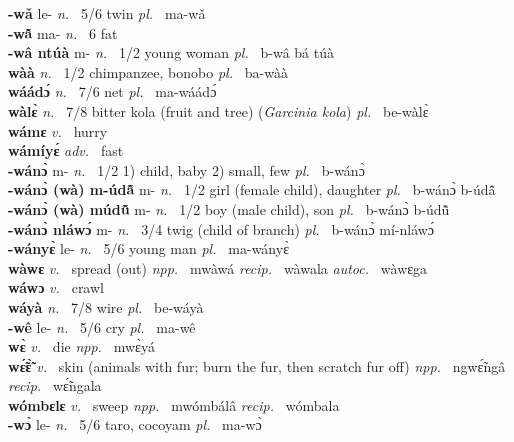 \noindent
{\bfseries -wǎ} le- {\itshape n.~} 5/6 twin {\itshape pl.~} ma-wǎ    \\ 
{\bfseries -wã̂} ma- {\itshape n.~} 6 fat    \\ 
{\bfseries -wâ ntúà} m- {\itshape n.~} 1/2 young woman {\itshape pl.~} b-wâ bá túà    \\ 
{\bfseries wàà} {\itshape n.~} 1/2 chimpanzee, bonobo {\itshape pl.~} ba-wàà    \\ 
{\bfseries wáádɔ́}  {\itshape n.~} 7/6 net {\itshape pl.~} ma-wáádɔ́    \\ 
{\bfseries wàlɛ̀}  {\itshape n.~} 7/8 bitter kola (fruit and tree) ({\itshape Garcinia kola}) {\itshape pl.~} be-wàlɛ̀    \\ 
{\bfseries wámɛ}  {\itshape v.~} hurry    \\ 
{\bfseries wámíyɛ́}  {\itshape adv.~} fast    \\ 
{\bfseries -wánɔ̀} m- {\itshape n.~} 1/2 1) child, baby 2) small, few {\itshape pl.~} b-wánɔ̀    \\ 
{\bfseries -wánɔ̀ (wà) m-údã̂} m- {\itshape n.~} 1/2 girl (female child), daughter {\itshape pl.~} b-wánɔ̀ b-údã̂    \\ 
{\bfseries -wánɔ̀ (wà) múdũ̂} m- {\itshape n.~} 1/2 boy (male child), son {\itshape pl.~} b-wánɔ̀ b-údũ̂    \\ 
{\bfseries -wánɔ̀ nláwɔ́} m- {\itshape n.~} 3/4 twig (child of branch) {\itshape pl.~} b-wánɔ̀ mí-nláwɔ́    \\ 
{\bfseries -wányɛ̀} le- {\itshape n.~} 5/6 young man {\itshape pl.~} ma-wányɛ̀    \\ 
{\bfseries wàwɛ}  {\itshape v.~} spread (out)   {\itshape npp.~} mwàwá {\itshape recip.~} wàwala {\itshape autoc.~} wàwɛga  \\ 
{\bfseries wáwɔ}  {\itshape v.~} crawl    \\ 
{\bfseries wáyà}  {\itshape n.~} 7/8 wire {\itshape pl.~} be-wáyà    \\ 
{\bfseries -wê} le- {\itshape n.~} 5/6 cry {\itshape pl.~} ma-wê    \\ 
{\bfseries wɛ̀}  {\itshape v.~} die   {\itshape npp.~} mwɛ̀yá  \\ 
{\bfseries wɛ̃́ɛ̃̀}  {\itshape v.~} skin (animals with fur; burn the fur, then scratch fur off)   {\itshape npp.~} ngwɛ̃́ngâ {\itshape recip.~} wɛ̃́ngala  \\ 
{\bfseries wómbɛlɛ}  {\itshape v.~} sweep   {\itshape npp.~} mwómbálâ {\itshape recip.~} wómbala  \\ 
{\bfseries -wɔ̀} le- {\itshape n.~} 5/6 taro, cocoyam {\itshape pl.~} ma-wɔ̀    \\ 
